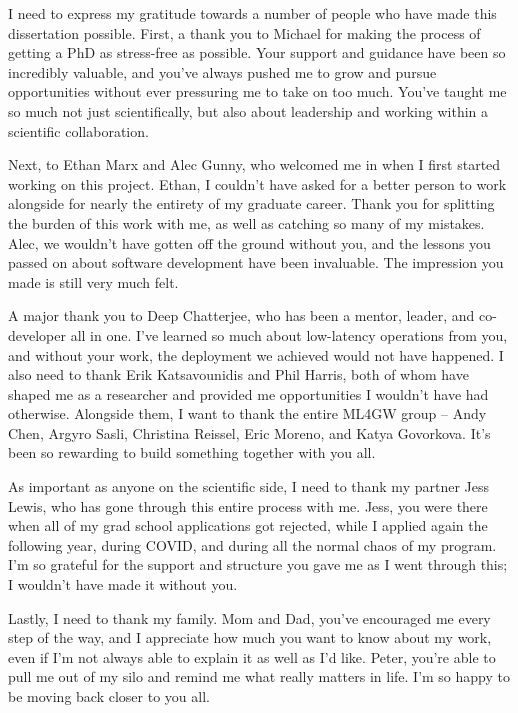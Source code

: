
I need to express my gratitude towards a number of people who have made this dissertation possible.
First, a thank you to Michael for making the process of getting a PhD as stress-free as possible.
Your support and guidance have been so incredibly valuable, and you've always pushed me to grow and pursue opportunities without ever pressuring me to take on too much.
You've taught me so much not just scientifically, but also about leadership and working within a scientific collaboration.

Next, to Ethan Marx and Alec Gunny, who welcomed me in when I first started working on this project.
Ethan, I couldn't have asked for a better person to work alongside for nearly the entirety of my graduate career.
Thank you for splitting the burden of this work with me, as well as catching so many of my mistakes.
Alec, we wouldn't have gotten off the ground without you, and the lessons you passed on about software development have been invaluable.
The impression you made is still very much felt.

A major thank you to Deep Chatterjee, who has been a mentor, leader, and co-developer all in one.
I've learned so much about low-latency operations from you, and without your work, the deployment we achieved would not have happened.
I also need to thank Erik Katsavounidis and Phil Harris, both of whom have shaped me as a researcher and provided me opportunities I wouldn't have had otherwise.
Alongside them, I want to thank the entire ML4GW group -- Andy Chen, Argyro Sasli, Christina Reissel, Eric Moreno, and Katya Govorkova.
It's been so rewarding to build something together with you all.

 
As important as anyone on the scientific side, I need to thank my partner Jess Lewis, who has gone through this entire process with me.
Jess, you were there when all of my grad school applications got rejected, while I applied again the following year, during COVID, and during all the normal chaos of my program.
I'm so grateful for the support and structure you gave me as I went through this; I wouldn't have made it without you.

Lastly, I need to thank my family.
Mom and Dad, you've encouraged me every step of the way, and I appreciate how much you want to know about my work, even if I'm not always able to explain it as well as I'd like.
Peter, you're able to pull me out of my silo and remind me what really matters in life.
I'm so happy to be moving back closer to you all.

